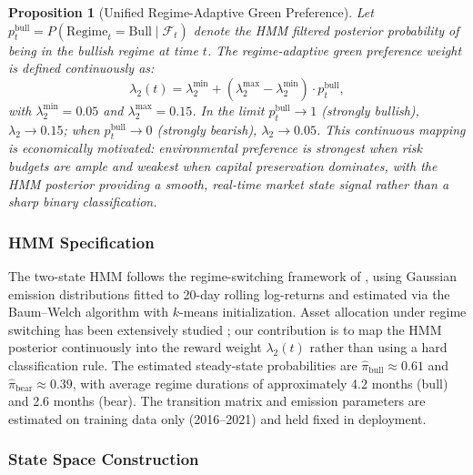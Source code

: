 \documentclass[12pt]{article}
\newtheorem{proposition}{Proposition}
\begin{document}
\begin{proposition}[Unified Regime-Adaptive Green Preference]
\label{prop:regime}
Let $p_t^{\mathrm{bull}} = P(\mathrm{Regime}_t=\mathrm{Bull}\mid
\mathcal{F}_t)$ denote the HMM filtered posterior probability of being
in the bullish regime at time $t$. The regime-adaptive green preference
weight is defined continuously as:
\begin{equation}
  \lambda_2(t) = \lambda_2^{\min}
    + (\lambda_2^{\max}-\lambda_2^{\min})\cdot p_t^{\mathrm{bull}},
  \label{eq:adaptive_lambda}
\end{equation}
with $\lambda_2^{\min}=0.05$ and $\lambda_2^{\max}=0.15$. In the
limit $p_t^{\mathrm{bull}}\to 1$ (strongly bullish), $\lambda_2\to0.15$;
when $p_t^{\mathrm{bull}}\to 0$ (strongly bearish), $\lambda_2\to0.05$.
This continuous mapping is economically motivated: environmental
preference is strongest when risk budgets are ample and weakest when
capital preservation dominates, with the HMM posterior providing a
smooth, real-time market state signal rather than a sharp binary
classification.
\end{proposition}

\subsubsection*{HMM Specification}
The two-state HMM follows the regime-switching framework of
\citet{hamilton1989new}, using Gaussian emission distributions fitted
to 20-day rolling log-returns and estimated via the Baum--Welch
algorithm with $k$-means initialization. Asset allocation under
regime switching has been extensively studied
\citep{ang2002international}; our contribution is to map the HMM
posterior continuously into the reward weight $\lambda_2(t)$ rather
than using a hard classification rule. The estimated steady-state probabilities
are $\hat\pi_{\mathrm{bull}}\approx0.61$ and
$\hat\pi_{\mathrm{bear}}\approx0.39$, with average regime durations of
approximately 4.2 months (bull) and 2.6 months (bear). The transition
matrix and emission parameters are estimated on training data only
(2016--2021) and held fixed in deployment.

\subsubsection{State Space Construction}
\end{document}
